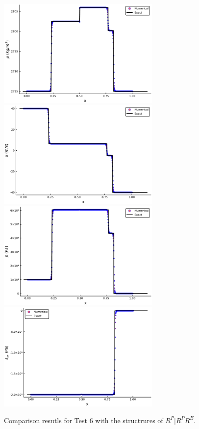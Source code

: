 \documentclass{article}
\numberwithin{equation}{section}
\numberwithin{table}{section}
\begin{document}
\begin{figure}
  \centering

  \includegraphics[width= 8cm] {case5rho.pdf}
  \includegraphics[width= 8cm] {case5u.pdf}
  \includegraphics[width= 8cm] {case5p.pdf}
  \includegraphics[width= 8cm] {case5sxx.pdf}

    \caption{Comparison resutls for Test 6 with the structrures of $R^P|R^PR^E$.  }
  \label{fig:case5}
\end{figure}
\end{document}
